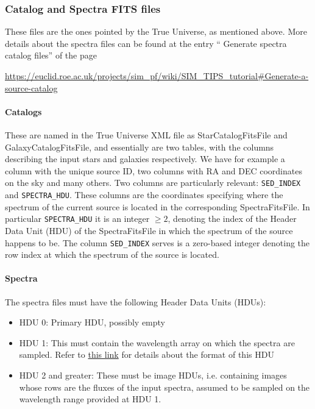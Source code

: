 \subsubsection{Catalog and Spectra FITS files}\label{subsubsec:catalogs_spectra_fits}

These files are the ones pointed by the True Universe, as mentioned above. More details about the spectra files can be found at the entry `` Generate spectra catalog files'' of the page

\begin{center}
\hypertarget{url:spectra_file_redmine}{\url{https://euclid.roe.ac.uk/projects/sim_pf/wiki/SIM_TIPS_tutorial#Generate-a-source-catalog}}
\end{center}

\paragraph{Catalogs}
These are named in the True Universe XML file as StarCatalogFitsFile and GalaxyCatalogFitsFile, and essentially are two tables, with the columns describing the input stars and galaxies respectively. We have for example a column with the unique source ID, two columns with RA and DEC coordinates on the sky and many others. Two columns are particularly relevant: \verb+SED_INDEX+ and \verb+SPECTRA_HDU+. These columns are the coordinates specifying where the spectrum of the current source is located in the corresponding SpectraFitsFile. In particular \verb+SPECTRA_HDU+ it is an integer $\geq 2$, denoting the index of the Header Data Unit (HDU) of the SpectraFitsFile in which the spectrum of the source happens to be. The column \verb+SED_INDEX+ serves is a zero-based integer denoting the row index at which the spectrum of the source is located. 

\paragraph{Spectra}

The spectra files must have the following Header Data Units (HDUs):
\begin{itemize}
\item HDU 0: Primary HDU, possibly empty
\item HDU 1: This must contain the wavelength array on which the spectra are sampled. Refer to \hyperlink{url:spectra_file_redmine}{this link} for details about the format of this HDU
\item HDU 2 and greater: These must be image HDUs, i.e. containing images whose rows are the fluxes of the input spectra, assumed to be sampled on the wavelength range provided at HDU 1.
\end{itemize}

